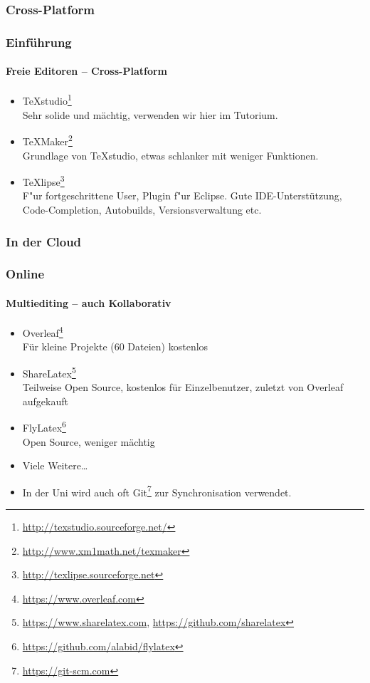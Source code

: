 \subsubsection{Cross-Platform}
\begin{frame}
\frametitle{Einf\"uhrung}
\framesubtitle{Freie Editoren -- Cross-Platform}
\begin{itemize}
  \item TeXstudio\footnote{\url{http://texstudio.sourceforge.net/}}\\
  Sehr solide und mächtig, verwenden wir hier im Tutorium.
  \item TeXMaker\footnote{\url{http://www.xm1math.net/texmaker}}\\
   Grundlage von TeXstudio, etwas schlanker mit weniger Funktionen.
  \item TeXlipse\footnote{\url{http://texlipse.sourceforge.net}}\\ F"ur fortgeschrittene User, Plugin f"ur
  Eclipse. Gute IDE-Unterst\"utzung, Code-Completion, Autobuilds, Versionsverwaltung etc.
\end{itemize}
\end{frame}


\subsubsection{In der Cloud}
\begin{frame}
\frametitle{Online}
\framesubtitle{Multiediting -- auch Kollaborativ}
\begin{itemize}
  \item Overleaf\footnote{\url{https://www.overleaf.com}}\\
  F\"ur kleine Projekte (60 Dateien) kostenlos
  \item ShareLatex\footnote{\url{https://www.sharelatex.com}, \url{https://github.com/sharelatex}}\\
  Teilweise Open Source, kostenlos für Einzelbenutzer, zuletzt von Overleaf aufgekauft
  \item FlyLatex\footnote{\url{https://github.com/alabid/flylatex}}\\ 
  Open Source, weniger mächtig
  \item Viele Weitere\ldots
  \vspace{7mm}
  \item In der Uni wird auch oft Git\footnote{\url{https://git-scm.com}} zur Synchronisation verwendet.
\end{itemize}
\end{frame}


